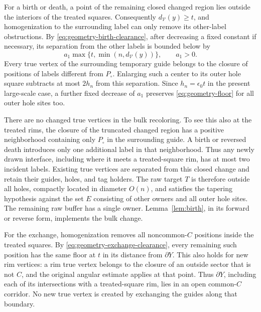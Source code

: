 \documentclass[11pt]{article}
\numberwithin{equation}{section}
\theoremstyle{definition}
\theoremstyle{remark}
\begin{document}
For a birth or death, a point of the remaining closed changed region
lies outside the interiors of the treated squares.  Consequently
$d_{\mathcal V}(y)\ge t$, and homogenization to the surrounding label
can only remove its other-label obstructions.  By
\eqref{eq:geometry-birth-clearance}, after decreasing a fixed constant
if necessary, its separation from the other labels is bounded below by
\begin{equation}
 a_1\max\{t,\min(n,d_{\mathcal V}(y))\},
 \qquad a_1>0.
 \label{eq:geometry-floor}
\end{equation}
Every true vertex of the surrounding temporary guide belongs to the
closure of positions of labels different from $P_\circ$.  Enlarging
such a center to its outer hole square subtracts at most $2h_n$ from
this separation.  Since $h_n=\epsilon_0t$ in the present large-scale
case, a further fixed decrease of $a_1$ preserves
\eqref{eq:geometry-floor} for all outer hole sites too.

There are no changed true vertices in the bulk recoloring.  To see
this also at the treated rims, the closure of the truncated changed
region has a positive neighborhood containing only $P_\circ$ in the
surrounding guide.  A birth or reversed death introduces only one
additional label in that neighborhood.  Thus any newly drawn
interface, including where it meets a treated-square rim, has at most
two incident labels.  Existing true vertices are separated from this
closed change and retain their guides, holes, and tag holders.  The
raw target $T$ is therefore outside all holes, compactly located in
diameter $O(n)$, and satisfies the tapering hypothesis against the set
$E$ consisting of other owners and all outer hole sites.  The remaining
raw buffer has a single owner.  Lemma~\ref{lem:birth}, in its forward
or reverse form, implements the bulk change.

For the exchange, homogenization removes all noncommon-$C$ positions
inside the treated squares.  By
\eqref{eq:geometry-exchange-clearance}, every remaining such position
has the same floor at $t$ in its distance from $\partial Y$.  This
also holds for new rim vertices: a rim true vertex belongs to the
closure of an outside sector that is not $C$, and the original angular
estimate applies at that point.  Thus $\partial Y$, including each of
its intersections with a treated-square rim, lies in an open
common-$C$ corridor.  No new true vertex is created by exchanging
the guides along that boundary.
\end{document}
